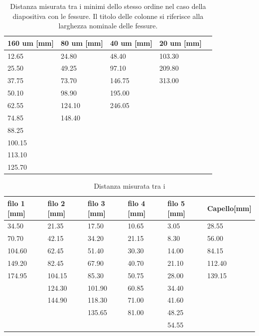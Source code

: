 \begin{table}
    \centering
    \footnotesize
    \begin{tabular}{l l l l l}
        \toprule
        160 um [mm]&    80 um [mm]&        40 um [mm]&     20 um [mm]\\
        \midrule
        12.65&       24.80&                        48.40&          103.30\\
        25.50&       49.25&                        97.10&          209.80\\
        37.75&       73.70&                        146.75&         313.00\\
        50.10&       98.90&                        195.00&\\
        62.55&      124.10&                       246.05&\\
        74.85&      148.40&&\\                       
        88.25&          &&\\
        100.15&&&\\
        113.10&&&\\
        125.70&&&\\
        \bottomrule
    \end{tabular}
    \caption{Distanza misurata tra i minimi dello stesso ordine nel caso della diapositiva con le fessure.
        Il titolo delle colonne si riferisce alla larghezza nominale delle fessure.}
    \label{tab:fessure}
\end{table}

\begin{table}
    \centering
    \footnotesize
    \begin{tabular}{l l l l l l}
        \toprule
        filo 1 [mm]&         filo 2 [mm]&         filo 3 [mm]&         filo 4 [mm]&         filo 5 [mm]&         Capello[mm]\\
        \midrule
        34.50&          21.35&          17.50&          10.65&          3.05&           28.55\\
        70.70&          42.15&          34.20&          21.15&          8.30&           56.00\\
        104.60&         62.45&          51.40&          30.30&          14.00&          84.15\\
        149.20&         82.45&          67.90&          40.70&          21.10&          112.40\\
        174.95&         104.15&         85.30&          50.75&          28.00&          139.15\\
        &              124.30&         101.90&         60.85&          34.40&          \\
        &              144.90&         118.30&         71.00&          41.60&          \\
        &              &              135.65&         81.00&          48.25&          \\
        &              &              &              &              54.55&          \\
        \bottomrule
    \end{tabular}
    \caption{Distanza misurata tra i }
    \label{tab:fili}
\end{table}


